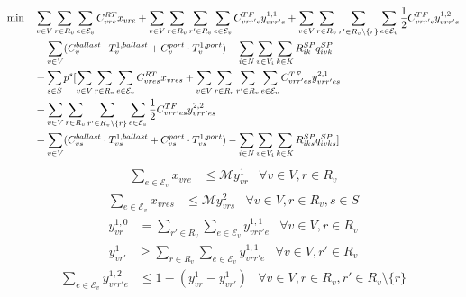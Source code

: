 \documentclass[11pt,english]{article}
\begin{document}
\begin{align}
    \min \quad & \sum_{v \in V} \sum_{r \in R_v} \sum_{e \in \mathcal{E}_v} C^{RT}_{vre} x_{vre} + \sum_{v \in V} \sum_{r \in R_v} \sum_{r' \in R_v} \sum_{e \in \mathcal{E}_v} C^{TF}_{vrr'e} y_{vrr'e}^{1,1} + \sum_{v \in V} \sum_{r \in R_v} \sum_{r' \in R_v \setminus \{r\} } \sum_{e \in \mathcal{E}_v} \frac{1}{2} C^{TF}_{vrr'e} y_{vrr'e}^{1,2} \notag \\
    & + \sum_{v \in V} (C_{v}^{ballast}\cdot T_{v}^{1,ballast} + C_{v}^{port}\cdot T_{v}^{1,port}) - \sum_{i \in N} \sum_{v \in V_i} \sum_{k \in K} R_{ik}^{SP} q_{ivk}^{SP} \notag \\
    & + \sum_{s \in S} p^s [ \sum_{v \in V} \sum_{r \in R_v} \sum_{e \in \mathcal{E}_v} C^{RT}_{vres} x_{vres} + \sum_{v \in V} \sum_{r \in R_v} \sum_{r' \in R_v} \sum_{e \in \mathcal{E}_v} C^{TF}_{vrr'es} y_{vrr'es}^{2,1} \notag \\ & + \sum_{v \in V} \sum_{r \in R_v} \sum_{r' \in R_v \setminus \{r\}} \sum_{e \in \mathcal{E}_v} \frac{1}{2} C^{TF}_{vrr'es} y_{vrr'es}^{2,2} \notag \\
    & + \sum_{v \in V} (C_{vs}^{ballast}\cdot T_{vs}^{1,ballast} + C_{vs}^{port}\cdot T_{vs}^{1,port}) - \sum_{i \in N} \sum_{v \in V_i} \sum_{k \in K} R_{iks}^{SP} q_{ivks}^{SP}]
    \label{eq:obj}
\end{align}
\begin{align}
    \sum_{e \in \mathcal{E}_v}x_{vre} &\leq \mathcal{M} y_{vr}^1 & \forall v \in V, r \in R_v \label{eq:route_select_1}
\end{align}
\begin{align}
    \sum_{e \in \mathcal{E}_v} x_{vres} &\leq \mathcal{M} y_{vrs}^2 & \forall v \in V, r \in R_v, s \in S \label{eq:route_select_2}
\end{align}
\begin{align}
    y_{vr}^{1,0} &= \sum_{r' \in R_v} \sum_{e \in \mathcal{E}_v} y_{vrr'e}^{1,1}  & \forall v \in V, r \in R_v \label{eq:route_select_3}
\end{align}
\begin{align}
   y_{vr'}^1 &\geq \sum_{r \in R_v} \sum_{e \in \mathcal{E}_v}  y_{vrr'e}^{1,1} & \forall v \in V, r' \in R_v \label{eq:route_select_4}
\end{align}
\begin{align}
    \sum_{e \in \mathcal{E}_v} y_{vrr'e}^{1,2} &\leq 1 - (y_{vr}^1 - y_{vr'}^1) & \forall v \in V, r \in R_v, r' \in R_v\setminus \{r\} \label{eq:route_select_5}
\end{align}
\end{document}
